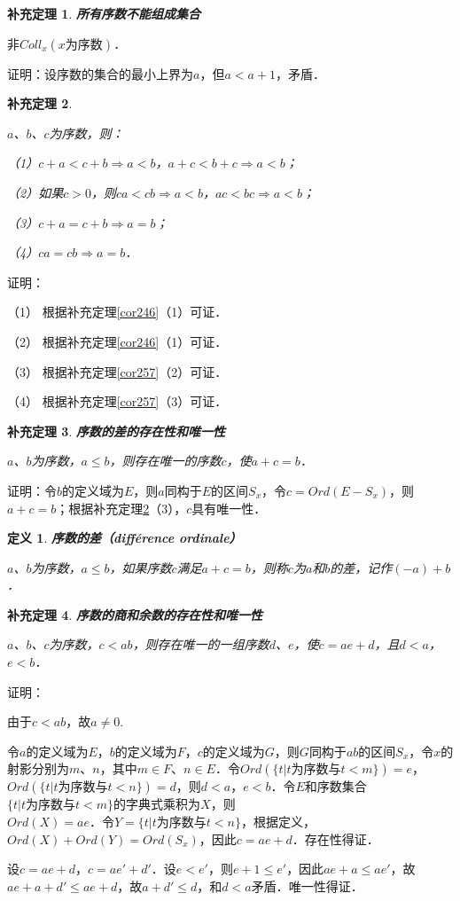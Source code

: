 \documentclass[12pt, a4paper, oneside]{book}
\newtheorem{cor}{补充定理}
\newtheorem{de}{定义}
\begin{document}
			\begin{cor}\label{cor259}
				\textbf{所有序数不能组成集合}
				\par
				$\text{非}Coll_x(x\text{为序数})$．	
			\end{cor}
			证明：设序数的集合的最小上界为$a$，但$a<a+1$，矛盾．
						
			\begin{cor}\label{cor260}
				\hfill\par
				$a$、$b$、$c$为序数，则：
				\par
				（1）$c+a<c+b\Rightarrow a<b$，$a+c<b+c\Rightarrow a<b$；
				\par
				（2）如果$c>0$，则$ca<cb\Rightarrow a<b$，$ac<bc\Rightarrow a<b$；
				\par
				（3）$c+a=c+b\Rightarrow a=b$；
				\par
				（4）$ca=cb\Rightarrow a=b$．
			\end{cor}
			证明：
			\par
			（1）	根据补充定理\ref{cor246}（1）可证．
			\par
			（2）	根据补充定理\ref{cor246}（1）可证．
			\par
			（3）	根据补充定理\ref{cor257}（2）可证．
			\par
			（4）	根据补充定理\ref{cor257}（3）可证．
						
			\begin{cor}\label{cor261}
				\textbf{序数的差的存在性和唯一性}
				\par
				$a$、$b$为序数，$a\leq b$，则存在唯一的序数$c$，使$a+c=b$．
			\end{cor}
			证明：令$b$的定义域为$E$，则$a$同构于$E$的区间$S_x$，令$c=Ord(E-S_x)$，则$a+c=b$；根据补充定理\ref{cor260}（3），$c$具有唯一性．
									
			\begin{de}
				\textbf{序数的差（différence ordinale）}
				\par
				$a$、$b$为序数，$a\leq b$，如果序数$c$满足$a+c=b$，则称$c$为$a$和$b$的差，记作$(-a)+b$．
			\end{de}
					
			\begin{cor}\label{cor262}
				\textbf{序数的商和余数的存在性和唯一性}
				\par
				$a$、$b$、$c$为序数，$c<ab$，则存在唯一的一组序数$d$、$e$，使$c=ae+d$，且$d<a$，$e<b$．
			\end{cor}
			证明：
			\par
			由于$c<ab$，故$a\neq 0$.
			\par
			令$a$的定义域为$E$，$b$的定义域为$F$，$c$的定义域为$G$，则$G$同构于$ab$的区间$S_x$，令$x$的射影分别为$m$、$n$，其中$m\in F$、$n\in E$．令$Ord(\{t|t\text{为序数}\text{与}t<m\})=e$，$Ord(\{t|t\text{为序数}\text{与}t<n\})=d$，则$d<a$，$e<b$．令$E$和序数集合$\{t|t\text{为序数}\text{与}t<m\}$的字典式乘积为$X$，则\\$Ord(X)=ae$．令$Y=\{t|t\text{为序数}\text{与}t<n\}$，根据定义，$Ord(X)+Ord(Y)=Ord(S_x)$，因此$c=ae+d$．存在性得证．
			\par
			设$c=ae+d$，$c=ae'+d'$．设$e<e'$，则$e+1\leq e'$，因此$ae+a\leq ae'$，故$ae+a+d'\leq ae+d$，故$a+d'\leq d$，和$d<a$矛盾．唯一性得证．
												
\end{document}
